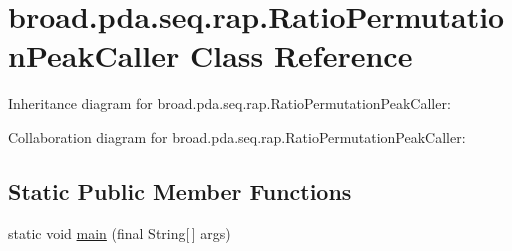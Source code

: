 \hypertarget{classbroad_1_1pda_1_1seq_1_1rap_1_1_ratio_permutation_peak_caller}{\section{broad.\+pda.\+seq.\+rap.\+Ratio\+Permutation\+Peak\+Caller Class Reference}
\label{classbroad_1_1pda_1_1seq_1_1rap_1_1_ratio_permutation_peak_caller}
}


Inheritance diagram for broad.\+pda.\+seq.\+rap.\+Ratio\+Permutation\+Peak\+Caller\+:


Collaboration diagram for broad.\+pda.\+seq.\+rap.\+Ratio\+Permutation\+Peak\+Caller\+:
\subsection*{Static Public Member Functions}
\begin{DoxyCompactItemize}
\item 
static void \hyperlink{classbroad_1_1pda_1_1seq_1_1rap_1_1_ratio_permutation_peak_caller_a9eae71bd208d09027028b53f4098a9df}{main} (final String\mbox{[}$\,$\mbox{]} args)
\end{DoxyCompactItemize}
